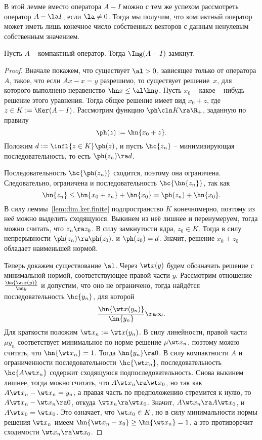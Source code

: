 \documentclass[a4paper]{article}
\begin{document}
\begin{note}
В этой лемме вместо оператора $A-I$ можно с тем же успехом рассмотреть оператор $A - \la I$,
если $\la \neq 0$. Тогда мы получим, что компактный оператор может иметь лишь конечное число собственных векторов
с данным ненулевым собственным значением.
\end{note}


\begin{lemma}\label{lem:cl.image}
Пусть $A$ -- компактный оператор. Тогда $\Img(A-I)$ замкнут.
\end{lemma}
\begin{proof}
Вначале покажем, что существует $\al > 0$, зависящее только от оператора $A$, такое,
что если $Ax - x = y$ разрешимо, то существует решение~$x$, для которого выполнено неравенство
$\hn x \le \al \hn y$.
Пусть $x_0$ -- какое -- нибудь решение этого уравнения. Тогда общее решение имеет
вид $x_0 + z$, где $z \in K := \Ker(A-I)$. Рассмотрим функцию $\ph\cln K \ra \R_+$, заданную по правилу
$$\ph(z) := \hn{x_0 + z}.$$
Положим $d := \infl{z \in K} \ph(z)$, и пусть $\hc{z_n}$ -- минимизирующая последовательность,
то есть $\ph(z_n) \ra d$.

Последовательность $\hc{\ph(z_n)}$ сходится, поэтому она ограничена. Следовательно,
ограничена и последовательность $\hc{\hn{z_n}}$, так как
$$\hn{z_n} \le \hn{x_0 + z_n} + \hn{x_0} = \ph(z_n) + \hn{x_0}.$$
В силу леммы~\ref{lem:dim.ker.finite} подпространство $K$ конечномерно, поэтому
из неё можно выделить сходящуюся. Выкинем из неё лишнее и перенумеруем, тогда
можно считать, что $z_n \ra z_0$. В силу замкнутости ядра, $z_0 \in K$.
Тогда в силу непрерывности $\ph(z_n) \ra \ph(z_0)$, и $\ph(z_0) = d$.
Значит, решение $x_0 + z_0$ обладает наименьшей нормой.

Теперь докажем существование $\al$. Через $\wt x(y)$ будем обозначать решение с минимальной нормой,
соответствующее правой части $y$. Рассмотрим отношение $\frac{\hn{\wt x(y)}}{\hn y}$ и допустим,
что оно не ограничено, тогда найдётся последовательность $\hc{y_n}$, для которой
$$\frac{\hn{\wt x(y_n)}}{\hn{y_n}} \ra \infty.$$
Для краткости положим $\wt x_n := \wt x(y_n)$.
В силу линейности, правой части $\mu y_n$ соответствует минимальное по норме решение $\mu \wt x_n$,
поэтому можно считать, что $\hn{\wt x_n} = 1$. Тогда $\hn{y_n} \ra 0$.
В силу компактности $A$ и ограниченности последовательности $\hc{\wt x_n}$,
последовательность $\hc{A\wt x_n}$ содержит сходящуюся подпоследовательность.
Снова выкинем лишнее, тогда можно считать, что $A\wt x_n \ra \wt x_0$,
но так как $A\wt x_n - \wt x_n = y_n$, а правая часть по предположению стремится к нулю,
то $A\wt x_n -\wt x_n \ra 0$, откуда $\wt x_n \ra \wt x_0$. Значит, $A\wt x_n \ra A\wt x_0$,
и $A \wt x_0 = \wt x_0$. Это означает, что  $\wt x_0 \in K$,
но в силу минимальности нормы решения $\wt x_n$ имеем
$\hn{\wt x_n - x_0} \ge \hn{\wt x_n} = 1$, а это противоречит сходимости $\wt x_n \ra \wt x_0$.


\end{proof}
\end{document}
